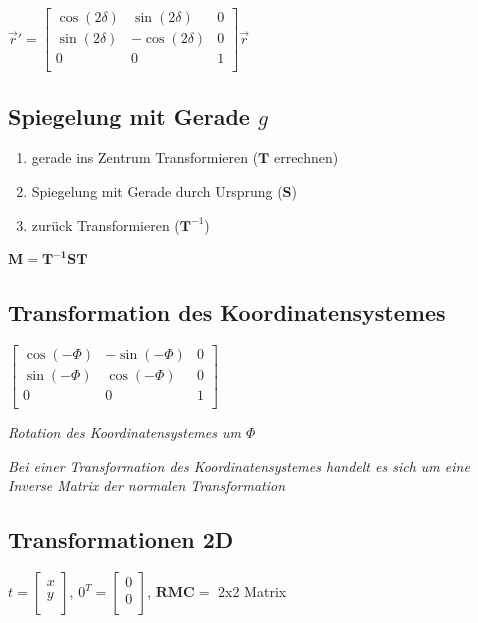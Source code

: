 $\vec{r}' = \left[\begin{array}{cc|c}
    \cos(2\delta) & \sin(2\delta) & 0 \\
    \sin(2\delta) & -\cos(2\delta) & 0 \\
    \hline
    0 & 0 & 1 \\
\end{array}\right] \vec{r}$

\subsection{Spiegelung mit Gerade $g$}

\begin{enumerate}
    \item gerade ins Zentrum Transformieren ($\mathbf{T}$ errechnen)
    \item Spiegelung mit Gerade durch Ursprung ($\mathbf{S}$)
    \item zurück Transformieren ($\mathbf{T}^{-1}$)
\end{enumerate}

$\mathbf{M} = \mathbf{T^{-1}ST}$

\subsection{Transformation des Koordinatensystemes}

$ \begin{bmatrix}
    \cos(-\Phi) & -\sin(-\Phi) & 0 \\
    \sin(-\Phi) & \cos(-\Phi) & 0 \\
    0 & 0 & 1 \\
\end{bmatrix}$

\textit{Rotation des Koordinatensystemes um $\Phi$}

\textit{Bei einer Transformation des Koordinatensystemes
handelt es sich um eine Inverse Matrix der normalen
Transformation}

\subsection{Transformationen 2D}

$t=\begin{bmatrix}
    x \\
    y \\
\end{bmatrix}$, $0^T = \begin{bmatrix}
    0 \\
    0 \\
\end{bmatrix}$, $\mathbf{RMC} =$ 2x2 Matrix

